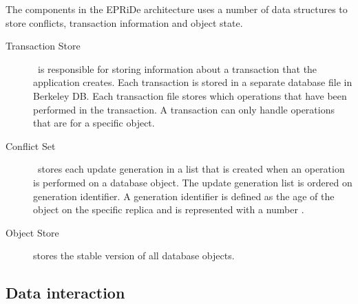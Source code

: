 The components in the EPRiDe architecture uses a number of data structures to store conflicts, transaction information and object state. 
\begin{description}
	
	\item[Transaction Store] \
	is responsible for storing information about a transaction that the application creates. Each transaction is stored in a separate database file in Berkeley DB.  Each transaction file stores which operations that have been performed in the transaction. A transaction can only handle operations that are for a specific object.
	
	\item[Conflict Set] \
	stores each update generation in a list that is created when an operation is performed on a database object. The update generation list is ordered on generation identifier. A generation identifier is defined as the age of the object on the specific replica and is represented with a number \cite[]{Syber2007}.
	
	\item[Object Store] stores the stable version of all database objects.
\end{description}
    
 


\subsection{Data interaction} %
\label{sub:data_interaction}

